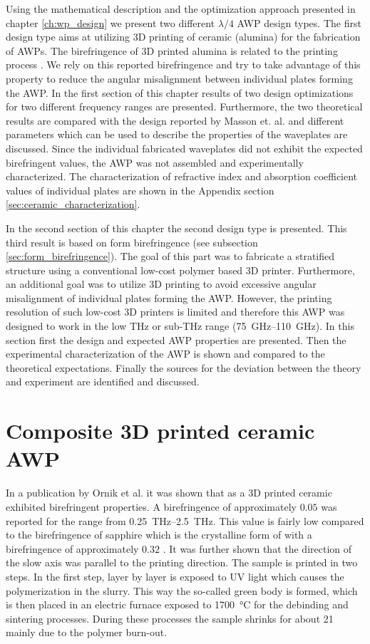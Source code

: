 Using the mathematical description and the optimization approach presented in chapter \ref{ch:wp_design} we present two different $\lambda/4$ AWP design types. The first design type aims at utilizing 3D printing of ceramic  (alumina) for the fabrication of AWPs. The birefringence of 3D printed alumina is related to the printing process \cite{Ornik2021}. We rely on this reported birefringence and try to take advantage of this property to reduce the angular misalignment between individual plates forming the AWP. In the first section of this chapter results of two design optimizations for two different frequency ranges are presented. Furthermore, the two theoretical results are compared with the design reported by Masson et. al. \cite{Masson2006} and different parameters which can be used to describe the properties of the waveplates are discussed. Since the individual fabricated waveplates did not exhibit the expected birefringent values, the AWP was not assembled and experimentally characterized. The characterization of refractive index and absorption coefficient values of individual plates are shown in the Appendix section \ref{sec:ceramic_characterization}.

In the second section of this chapter the second design type is presented. This third result is based on form birefringence (see subsection \ref{sec:form_birefringence}). The goal of this part was to fabricate a stratified structure using a conventional low-cost polymer based 3D printer. Furthermore, an additional goal was to utilize 3D printing to avoid excessive angular misalignment of individual plates forming the AWP. However, the printing resolution of such low-cost 3D printers is limited and therefore this AWP was designed to work in the low THz or sub-THz range (\SIrange{75}{110}{\giga \hertz}). In this section first the design and expected AWP properties are presented. Then the experimental characterization of the AWP is shown and compared to the theoretical expectations. Finally the sources for the deviation between the theory and experiment are identified and discussed.

\section{Composite 3D printed ceramic AWP}
In a publication by Ornik et al. it was shown that  as a 3D printed ceramic exhibited birefringent properties. A birefringence of approximately $0.05$ was reported for the range from \SIrange{0.25}{2.5}{\tera \hertz}. This value is fairly low compared to the birefringence of sapphire which is the crystalline form of  with a birefringence of approximately $0.32$ \cite{Wu2020}. It was further shown that the direction of the slow axis was parallel to the printing direction. The sample is printed in two steps. In the first step, layer by layer is exposed to UV light which causes the polymerization in the slurry. This way the so-called green body is formed, which is then placed in an electric furnace exposed to \SI{1700}{\celsius} for the debinding and sintering processes. During these processes the sample shrinks for about \SI{21}{\volpercent} mainly due to the polymer burn-out. 

